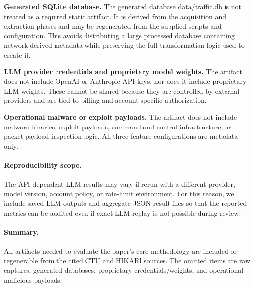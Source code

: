 \documentclass[letterpaper,twocolumn,10pt]{article}
\begin{document}
\textbf{Generated SQLite database.}
The generated database data/traffic.db is not treated as a required static artifact. It is derived from the acquisition and extraction phases and may be regenerated from the supplied scripts and configuration. This avoids distributing a large processed database containing network-derived metadata while preserving the full transformation logic used to create it.

\textbf{LLM provider credentials and proprietary model weights.}
The artifact does not include OpenAI or Anthropic API keys, nor does it include proprietary LLM weights. These cannot be shared because they are controlled by external providers and are tied to billing and account-specific authorization.

\textbf{Operational malware or exploit payloads.}
The artifact does not include malware binaries, exploit payloads, command-and-control infrastructure, or packet-payload inspection logic. All three feature configurations are metadata-only.

\paragraph{Reproducibility scope.}
The API-dependent LLM results may vary if rerun with a different provider, model version, account policy, or rate-limit environment. For this reason, we include saved LLM outputs and aggregate JSON result files so that the reported metrics can be audited even if exact LLM replay is not possible during review.

\paragraph{Summary.}
All artifacts needed to evaluate the paper's core methodology are included or regenerable from the cited CTU and HIKARI sources. The omitted items are raw captures, generated databases, proprietary credentials/weights, and operational malicious payloads.
\end{document}
